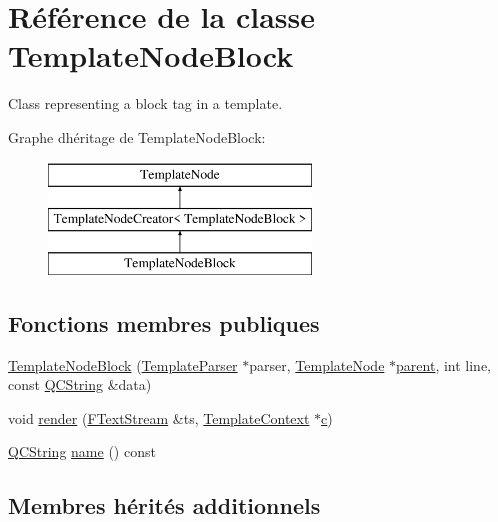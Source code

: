 \hypertarget{class_template_node_block}{}\section{Référence de la classe Template\+Node\+Block}
\label{class_template_node_block}


Class representing a \textquotesingle{}block\textquotesingle{} tag in a template.  


Graphe d\textquotesingle{}héritage de Template\+Node\+Block\+:\begin{figure}[H]
\begin{center}
\leavevmode
\includegraphics[height=3.000000cm]{class_template_node_block}
\end{center}
\end{figure}
\subsection*{Fonctions membres publiques}
\begin{DoxyCompactItemize}
\item 
\hyperlink{class_template_node_block_a1c6e8ec8cc52b1175a2e726b0f89172e}{Template\+Node\+Block} (\hyperlink{class_template_parser}{Template\+Parser} $\ast$parser, \hyperlink{class_template_node}{Template\+Node} $\ast$\hyperlink{class_template_node_a69a306ef84e62af9fe57bf9aacc94536}{parent}, int line, const \hyperlink{class_q_c_string}{Q\+C\+String} \&data)
\item 
void \hyperlink{class_template_node_block_ab5b5953d9e1ae88ef8a1dc11afff6bfe}{render} (\hyperlink{class_f_text_stream}{F\+Text\+Stream} \&ts, \hyperlink{class_template_context}{Template\+Context} $\ast$\hyperlink{060__command__switch_8tcl_ab14f56bc3bd7680490ece4ad7815465f}{c})
\item 
\hyperlink{class_q_c_string}{Q\+C\+String} \hyperlink{class_template_node_block_ad786ac6cbf3591e61e7d5964840ea00e}{name} () const 
\end{DoxyCompactItemize}
\subsection*{Membres hérités additionnels}


